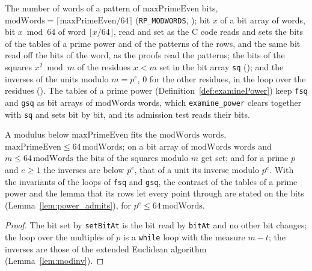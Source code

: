 \begin{definition}\label{def:powerWords}
  \leanok
  The number of words of a pattern of $\mathrm{maxPrimeEven}$ bits,
  $\mathrm{modWords} = \lceil \mathrm{maxPrimeEven}/64 \rceil$ (\verb|RP_MODWORDS|,
  ); bit $x$ of a bit array of words, bit $x \bmod 64$ of word
  $\lfloor x/64 \rfloor$, read and set as the C code reads and sets the bits of the tables of a
  prime power and of the patterns of the rows, and the same bit read off the bits of the word, as
  the proofs read the patterns; the bits of the squares $x^2 \bmod m$ of the residues $x < m$ set in
  the bit array \verb|sq| (); and the inverses of the units
  modulo $m = p^e$, $0$ for the other residues, in the loop over the residues
  (). The tables of a prime power
  (Definition~\ref{def:examinePower}) keep \verb|fsq| and \verb|gsq| as bit arrays of
  $\mathrm{modWords}$ words, which \verb|examine_power| clears together with \verb|sq| and sets bit
  by bit, and its admission test reads their bits.
\end{definition}

\begin{lemma}\label{lem:powerWords}
  \leanok
  A modulus below $\mathrm{maxPrimeEven}$ fits the $\mathrm{modWords}$ words,
  $\mathrm{maxPrimeEven} \le 64\,\mathrm{modWords}$; on a bit array of $\mathrm{modWords}$ words and
  $m \le 64\,\mathrm{modWords}$ the bits of the squares modulo $m$ get set; and for a prime $p$ and
  $e \ge 1$ the inverses are below $p^e$, that of a unit its inverse modulo $p^e$. With the
  invariants of the loops of \verb|fsq| and \verb|gsq|, the contract of the tables of a prime power
  and the lemma that its rows let every point through are stated on the bits
  (Lemma~\ref{lem:power_admits}), for $p^e \le 64\, \mathrm{modWords}$.
\end{lemma}

\begin{proof}
  \leanok
  The bit set by \verb|setBitAt| is the bit read by \verb|bitAt| and no other bit changes; the loop
  over the multiples of $p$ is a \verb|while| loop with the measure $m - t$; the inverses are those
  of the extended Euclidean algorithm (Lemma~\ref{lem:modinv}).
\end{proof}

